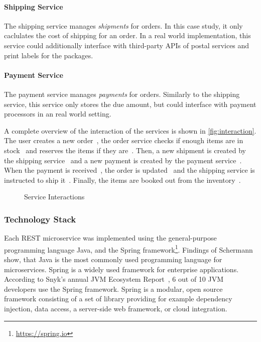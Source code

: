 \paragraph{Shipping Service}

The shipping service manages \textit{shipments} for orders.
In this case study, it only caclulates the cost of shipping for an order.
In a real world implementation, this service could additionally interface with third-party \acp{API} of postal services and print labels for the packages.

\paragraph{Payment Service}

The payment service manages \textit{payments} for orders.
Similarly to the shipping service, this service only stores the due amount, but could interface with payment processors in an real world setting.


A complete overview of the interaction of the services is shown in \autoref{fig:interaction}.
The user creates a new order~\raisebox{.5pt}{\textcircled{\raisebox{-.9pt} {1}}}, the order service checks if enough items are in stock~\raisebox{.5pt}{\textcircled{\raisebox{-.9pt} {2}}} and reserves the items if they are~\raisebox{.5pt}{\textcircled{\raisebox{-.9pt} {3}}}.
Then, a new shipment is created by the shipping service~\raisebox{.5pt}{\textcircled{\raisebox{-.9pt} {4}}} and a new payment is created by the payment service~\raisebox{.5pt}{\textcircled{\raisebox{-.9pt} {5}}}.
When the payment is received~\raisebox{.5pt}{\textcircled{\raisebox{-.9pt} {6}}}, the order is updated~\raisebox{.5pt}{\textcircled{\raisebox{-.9pt} {7}}} and the shipping service is instructed to ship it~\raisebox{.5pt}{\textcircled{\raisebox{-.9pt} {8}}}.
Finally, the items are booked out from the inventory~\raisebox{.5pt}{\textcircled{\raisebox{-.9pt} {9}}}.

\begin{figure}[!htb]
    \centering
    
    \caption{Service Interactions}
    \label{fig:interaction}
\end{figure}

\subsubsection{Technology Stack}

Each \acs{REST} microservice was implemented using the general-purpose programming language Java, and the Spring framework\footnote{\url{https://spring.io}}.
Findings of Schermann~\cite{Schermann2015} show, that Java is the most commonly used programming language for microservices.
Spring is a widely used framework for enterprise applications.
According to Snyk's annual \acs{JVM} Ecosystem Report~\cite{Vermeer2020}, 6 out of 10 \acs{JVM} developers use the Spring framework.
Spring is a modular, open source framework consisting of a set of library providing for example dependency injection, data access, a server-side web framework, or cloud integration.


